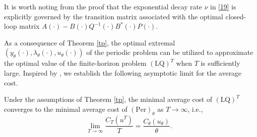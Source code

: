 \documentclass{IEEEtran}
\begin{document}
	\begin{remark}
		It is worth noting from the proof that the exponential decay rate $\nu$ in \eqref{19} is explicitly governed by the transition matrix associated with the optimal closed-loop matrix $A(\cdot)-B(\cdot)Q^{-1}(\cdot)B^*(\cdot)P(\cdot)$.
	\end{remark}
	As a consequence of Theorem \ref{tp}, the optimal extremal $(y_\theta(\cdot),\lambda_\theta(\cdot),u_\theta(\cdot))$ of the periodic problem can be utilized to approximate the optimal value of the finite-horizon problem $(\text{LQ})^T$ when $T$ is sufficiently large. Inspired by \cite[Theorem 2.2]{PZ13}, we establish the following asymptotic limit for the average cost.
	
	\begin{corollary}\label{prop:limit}
		Under the assumptions of Theorem \ref{tp}, the minimal average cost of $(\text{LQ})^T$ converges to the minimal average cost of $(\text{Per})_\theta$ as $T \to \infty$, i.e.,
		\begin{equation}\label{alim}
			\lim_{T \to \infty} \frac{C_{T}(u^T)}{T} = \frac{C_{\theta}(u_\theta)}{\theta}.
		\end{equation}
	\end{corollary}
\end{document}
